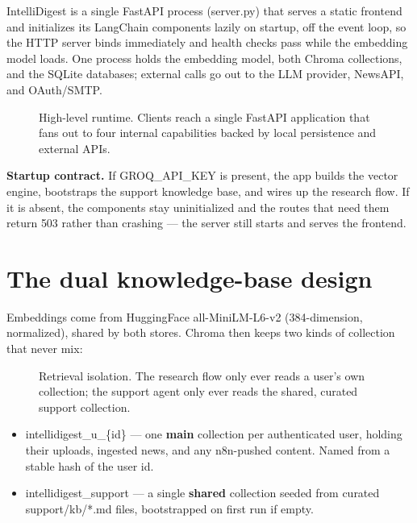 \documentclass[11pt]{article}
\newcommand{\code}[1]{{\ttfamily\small #1}}
\newcommand{\kw}[1]{\textcolor{accent}{\sffamily\bfseries #1}}
\begin{document}
IntelliDigest is a single FastAPI process (\code{server.py}) that serves a static
frontend and initializes its LangChain components lazily on startup, off the event
loop, so the HTTP server binds immediately and health checks pass while the
embedding model loads. One process holds the embedding model, both Chroma
collections, and the SQLite databases; external calls go out to the LLM provider,
NewsAPI, and OAuth/SMTP.

\begin{figure}[H]
\centering

\caption{High-level runtime. Clients reach a single FastAPI application that fans
out to four internal capabilities backed by local persistence and external APIs.}
\end{figure}

\begin{note}
\textbf{Startup contract.} If \code{GROQ\_API\_KEY} is present, the app builds the
vector engine, bootstraps the support knowledge base, and wires up the research
flow. If it is absent, the components stay uninitialized and the routes that need
them return \code{503} rather than crashing --- the server still starts and serves
the frontend.
\end{note}

\section{The dual knowledge-base design}
\label{sec:dualkb}

Embeddings come from HuggingFace \code{all-MiniLM-L6-v2} (384-dimension,
normalized), shared by both stores. Chroma then keeps two kinds of collection that
never mix:

\begin{figure}[H]
\centering

\caption{Retrieval isolation. The research flow only ever reads a user's own
collection; the support agent only ever reads the shared, curated support
collection.}
\end{figure}

\begin{itemize}
  \item \code{intellidigest\_u\_\{id\}} --- one \kw{main} collection per authenticated user, holding their uploads, ingested news, and any n8n-pushed content. Named from a stable hash of the user id.
  \item \code{intellidigest\_support} --- a single \kw{shared} collection seeded from curated \code{support/kb/*.md} files, bootstrapped on first run if empty.
\end{itemize}
\end{document}

